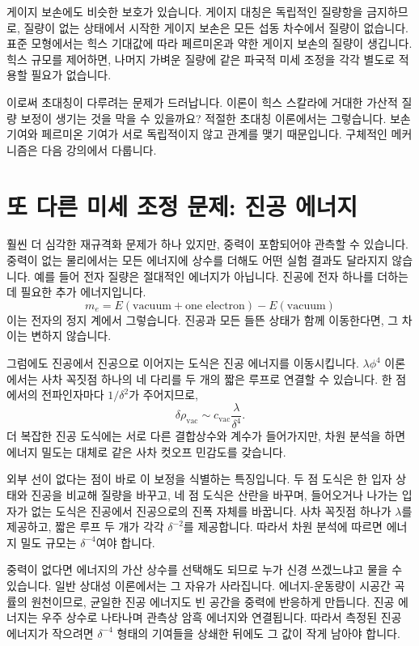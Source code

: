 게이지 보손에도 비슷한 보호가 있습니다. 게이지 대칭은 독립적인 질량항을 금지하므로, 질량이 없는 상태에서 시작한 게이지 보손은 모든 섭동 차수에서 질량이 없습니다. 표준 모형에서는 힉스 기대값에 따라 페르미온과 약한 게이지 보손의 질량이 생깁니다. 힉스 규모를 제어하면, 나머지 가벼운 질량에 같은 파국적 미세 조정을 각각 별도로 적용할 필요가 없습니다.

이로써 초대칭이 다루려는 문제가 드러납니다. 이론이 힉스 스칼라에 거대한 가산적 질량 보정이 생기는 것을 막을 수 있을까요? 적절한 초대칭 이론에서는 그렇습니다. 보손 기여와 페르미온 기여가 서로 독립적이지 않고 관계를 맺기 때문입니다. 구체적인 메커니즘은 다음 강의에서 다룹니다.

\section{또 다른 미세 조정 문제: 진공 에너지}

훨씬 더 심각한 재규격화 문제가 하나 있지만, 중력이 포함되어야 관측할 수 있습니다. 중력이 없는 물리에서는 모든 에너지에 상수를 더해도 어떤 실험 결과도 달라지지 않습니다. 예를 들어 전자 질량은 절대적인 에너지가 아닙니다. 진공에 전자 하나를 더하는 데 필요한 추가 에너지입니다.
\begin{equation}
m_e=E(\text{vacuum}+\text{one electron})-E(\text{vacuum})
\end{equation}
이는 전자의 정지 계에서 그렇습니다. 진공과 모든 들뜬 상태가 함께 이동한다면, 그 차이는 변하지 않습니다.

그럼에도 진공에서 진공으로 이어지는 도식은 진공 에너지를 이동시킵니다. \(\lambda\phi^4\) 이론에서는 사차 꼭짓점 하나의 네 다리를 두 개의 짧은 루프로 연결할 수 있습니다. 한 점에서의 전파인자마다 \(1/\delta^2\)가 주어지므로,
\begin{equation}
\delta\rho_{\mathrm{vac}}
\sim
c_{\mathrm{vac}}\frac{\lambda}{\delta^4}.
\label{eq:vacuum-energy-divergence}
\end{equation}
더 복잡한 진공 도식에는 서로 다른 결합상수와 계수가 들어가지만, 차원 분석을 하면 에너지 밀도는 대체로 같은 사차 컷오프 민감도를 갖습니다.

외부 선이 없다는 점이 바로 이 보정을 식별하는 특징입니다. 두 점 도식은 한 입자 상태와 진공을 비교해 질량을 바꾸고, 네 점 도식은 산란을 바꾸며, 들어오거나 나가는 입자가 없는 도식은 진공에서 진공으로의 진폭 자체를 바꿉니다. 사차 꼭짓점 하나가 \(\lambda\)를 제공하고, 짧은 루프 두 개가 각각 \(\delta^{-2}\)를 제공합니다. 따라서 차원 분석에 따르면 에너지 밀도 규모는 \(\delta^{-4}\)여야 합니다.

중력이 없다면 에너지의 가산 상수를 선택해도 되므로 누가 신경 쓰겠느냐고 물을 수 있습니다. 일반 상대성 이론에서는 그 자유가 사라집니다. 에너지-운동량이 시공간 곡률의 원천이므로, 균일한 진공 에너지도 빈 공간을 중력에 반응하게 만듭니다. 진공 에너지는 우주 상수로 나타나며 관측상 암흑 에너지와 연결됩니다. 따라서 측정된 진공 에너지가 작으려면 \(\delta^{-4}\) 형태의 기여들을 상쇄한 뒤에도 그 값이 작게 남아야 합니다.

